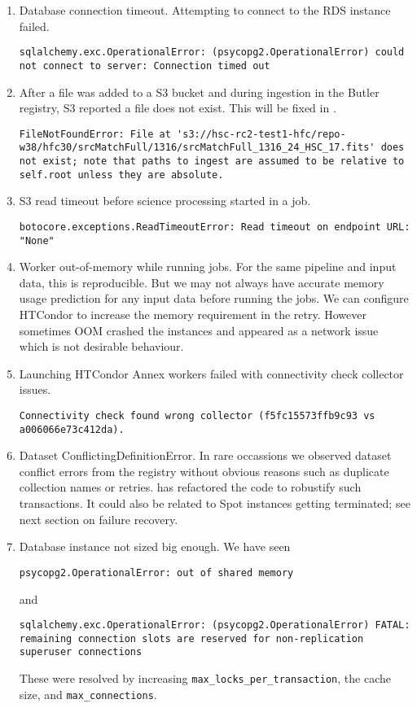 \begin{enumerate}
\item Database connection timeout. Attempting to connect to the RDS instance failed.
\begin{lstlisting}[style=basherror]
sqlalchemy.exc.OperationalError: (psycopg2.OperationalError) could not connect to server: Connection timed out
\end{lstlisting}
\item
After a file was added to a S3 bucket and during ingestion in the Butler registry, S3 reported a file does not exist.
This will be fixed in .
\begin{lstlisting}[style=basherror]
FileNotFoundError: File at 's3://hsc-rc2-test1-hfc/repo-w38/hfc30/srcMatchFull/1316/srcMatchFull_1316_24_HSC_17.fits' does not exist; note that paths to ingest are assumed to be relative to self.root unless they are absolute.
\end{lstlisting}
\item S3 read timeout before science processing started in a job.
\begin{lstlisting}[style=basherror]
botocore.exceptions.ReadTimeoutError: Read timeout on endpoint URL: "None"
\end{lstlisting}
\item Worker out-of-memory while running jobs.
For the same pipeline and input data, this is reproducible.
But we may not always have accurate memory usage prediction for any input data before running the jobs.
We can configure HTCondor to increase the memory requirement in the retry.
However sometimes OOM crashed the instances and appeared as a network issue which is not  desirable behaviour.
\item Launching HTCondor Annex workers failed with connectivity check collector issues.
\begin{lstlisting}[style=basherror]
Connectivity check found wrong collector (f5fc15573ffb9c93 vs a006066e73c412da).
\end{lstlisting}
\item Dataset ConflictingDefinitionError.
In rare occassions we observed dataset conflict errors from the registry without obvious reasons such as duplicate collection names or retries.
 has refactored the code to robustify such transactions.
It could also be related to Spot instances getting terminated;
see next section on failure recovery.
\item Database instance not sized big enough.
We have seen
\begin{lstlisting}[style=basherror]
psycopg2.OperationalError: out of shared memory
\end{lstlisting}
and
\begin{lstlisting}[style=basherror]
sqlalchemy.exc.OperationalError: (psycopg2.OperationalError) FATAL:  remaining connection slots are reserved for non-replication superuser connections
\end{lstlisting}
These were resolved by increasing \texttt{max\_locks\_per\_transaction}, the cache size, and \texttt{max\_connections}.
\end{enumerate}


